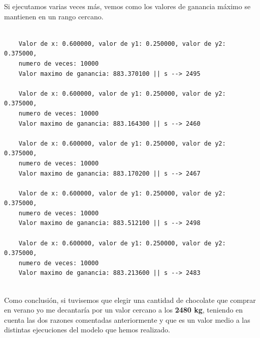 \documentclass[11pt,a4paper]{article}
\begin{document}
Si ejecutamos varias veces más, vemos como los valores de ganancia máximo se mantienen en un rango cercano.
\begin{lstlisting}

	Valor de x: 0.600000, valor de y1: 0.250000, valor de y2: 0.375000,
	numero de veces: 10000
	Valor maximo de ganancia: 883.370100 || s --> 2495

	Valor de x: 0.600000, valor de y1: 0.250000, valor de y2: 0.375000,
	numero de veces: 10000
	Valor maximo de ganancia: 883.164300 || s --> 2460

	Valor de x: 0.600000, valor de y1: 0.250000, valor de y2: 0.375000,
	numero de veces: 10000
	Valor maximo de ganancia: 883.170200 || s --> 2467
	
	Valor de x: 0.600000, valor de y1: 0.250000, valor de y2: 0.375000,
	numero de veces: 10000
	Valor maximo de ganancia: 883.512100 || s --> 2498

	Valor de x: 0.600000, valor de y1: 0.250000, valor de y2: 0.375000,
	numero de veces: 10000
	Valor maximo de ganancia: 883.213600 || s --> 2483
		
\end{lstlisting}

Como conclusión, si tuvisemos que elegir una cantidad de chocolate que comprar en verano yo me decantaría por un valor cercano a los \textbf{2480 kg},
teniendo en cuenta las dos razones comentadas anteriormente y que es un valor medio a las distintas ejecuciones del modelo que hemos realizado.
\end{document}
